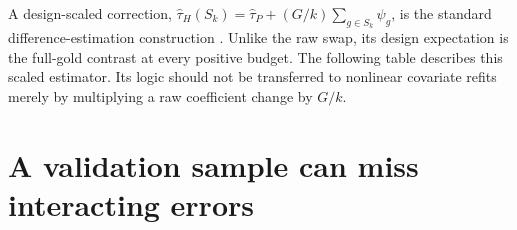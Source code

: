 \documentclass[11pt]{article}
\begin{document}
\begin{table}[H]\centering\small

\caption{Retained outcome benchmark: 20 clusters of 50 observations. Top-two share
is the share of absolute correction contributions in the two largest clusters.}
\end{table}

A design-scaled correction,
$\widehat\tau_H(S_k)=\widehat\tau_P+(G/k)\sum_{g\in S_k}\psi_g$, is the standard
difference-estimation construction \citep{horvitz1952,sarndal1992}. Unlike the raw
swap, its design expectation is the full-gold contrast at every positive budget.
The following table describes this scaled estimator. Its logic should not be
transferred to nonlinear covariate refits merely by multiplying a raw coefficient
change by $G/k$.

\begin{table}[H]\centering\small

\caption{Design-scaled outcome correction. Quantiles, SD and tail risk are over
uniform fixed-size subsets. Tail risk is the probability of an absolute departure
from the full-gold contrast greater than \TailThreshold; ``Normal price'' is the
corresponding Normal approximation using the exact variance. These are conditional
benchmark probabilities, not confidence statements.}
\end{table}

\section{A validation sample can miss interacting errors}
\label{app:undetected-interactions}
\end{document}
